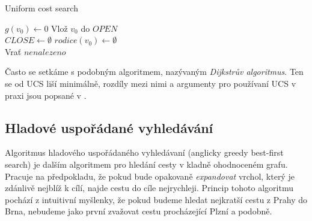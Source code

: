 \documentclass[12pt]{report}			%
\begin{document}
			\begin{algorithm}[H]

			    \caption{Uniform cost search}
			    \label{ucs}
  				$g(v_0) \gets 0$ 
  				Vlož $v_0$ do $OPEN$\\
  				
  				$CLOSE \gets \emptyset$ 
  				$rodice(v_0) \gets \emptyset$\\ %
  				
  				Vrať $nenalezeno$
		\end{algorithm}
				
				Často se setkáme s podobným algoritmem, nazývaným \emph{Dijkstrův algoritmus}. Ten se od UCS liší minimálně, rozdíly mezi nimi a argumenty pro používaní UCS v praxi jsou popsané v \cite{felner}.
			
			\subsection{Hladové uspořádané vyhledávání}
			Algoritmus hladového uspořádaného vyhledávaní (anglicky greedy best-first search) je dalším algoritmem pro hledání cesty v kladně ohodnoceném grafu. Pracuje na předpokladu, že pokud bude opakovaně \emph{expandovat} vrchol, který je zdánlivě nejblíž k cílí, najde cestu do cíle nejrychleji. Princip tohoto algoritmu pochází z intuitivní myšlenky, že pokud budeme hledat nejkratší cestu z Prahy do Brna, nebudeme jako první zvažovat cestu procházející Plzní a podobně. 
			
\end{document}
